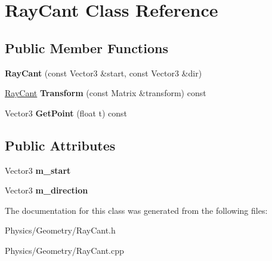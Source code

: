 \hypertarget{classRayCant}{}\section{Ray\+Cant Class Reference}
\label{classRayCant}
\subsection*{Public Member Functions}
\begin{DoxyCompactItemize}
\item 
\mbox{\label{classRayCant_a877eb7e0063451f39c8e4efacebeed11}} 
{\bfseries Ray\+Cant} (const Vector3 \&start, const Vector3 \&dir)
\item 
\mbox{\label{classRayCant_aa1732faaf14c4cddc76a57d000147eea}} 
\hyperlink{classRayCant}{Ray\+Cant} {\bfseries Transform} (const Matrix \&transform) const
\item 
\mbox{\label{classRayCant_a47d0b3fbd0dd627ab57d0134aed3110e}} 
Vector3 {\bfseries Get\+Point} (float t) const
\end{DoxyCompactItemize}
\subsection*{Public Attributes}
\begin{DoxyCompactItemize}
\item 
\mbox{\label{classRayCant_adcac88cbb75bf1f3354c8d2745000f6e}} 
Vector3 {\bfseries m\+\_\+start}
\item 
\mbox{\label{classRayCant_aee49a1db3a1b4482cb958af3d1f19930}} 
Vector3 {\bfseries m\+\_\+direction}
\end{DoxyCompactItemize}


The documentation for this class was generated from the following files\+:\begin{DoxyCompactItemize}
\item 
Physics/\+Geometry/Ray\+Cant.\+h\item 
Physics/\+Geometry/Ray\+Cant.\+cpp\end{DoxyCompactItemize}
